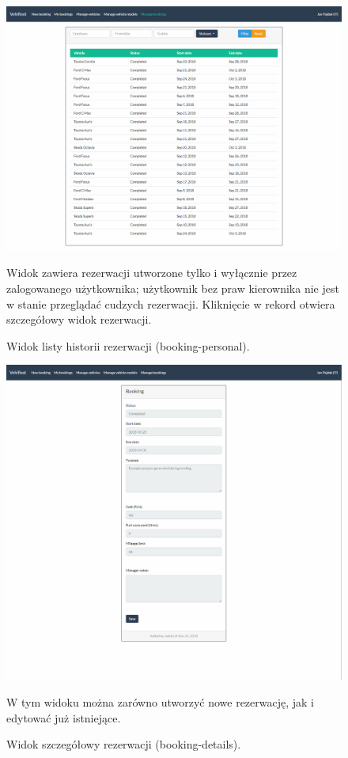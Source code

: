 \documentclass[eng,printmode,openany]{mgr}
\begin{document}
	\begin{figure}[H]
		\centering
		\includegraphics[width=\textwidth]{images/views/booking-list-manage.png}
		\caption{Widok listy historii rezerwacji (booking-personal).}
		\small 
		Widok zawiera rezerwacji utworzone tylko i wyłącznie przez zalogowanego użytkownika; użytkownik bez praw kierownika nie jest w stanie przeglądać cudzych rezerwacji. Kliknięcie w rekord otwiera szczegółowy widok rezerwacji.
	\end{figure}
	
	\begin{figure}[H]
		\centering
		\includegraphics[width=\textwidth]{images/views/booking-detail.png}
		\caption{Widok szczegółowy rezerwacji (booking-details).}
		\small 
		W tym widoku można zarówno utworzyć nowe rezerwację, jak i edytować już istniejące.
	\end{figure}
	
\end{document}
